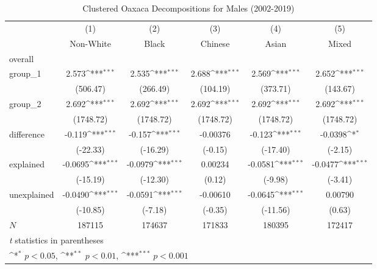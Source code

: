 \begin{table}[htbp]\centering
\def\sym#1{\ifmmode^{#1}\else\(^{#1}\)\fi}
\caption{Clustered Oaxaca Decompositions for Males (2002-2019)\label{tab1}}
\begin{tabular}{l*{5}{c}}
\hline\hline
            &\multicolumn{1}{c}{(1)}&\multicolumn{1}{c}{(2)}&\multicolumn{1}{c}{(3)}&\multicolumn{1}{c}{(4)}&\multicolumn{1}{c}{(5)}\\
            &\multicolumn{1}{c}{Non-White}&\multicolumn{1}{c}{Black}&\multicolumn{1}{c}{Chinese}&\multicolumn{1}{c}{Asian}&\multicolumn{1}{c}{Mixed}\\
\hline
overall     &                     &                     &                     &                     &                     \\
group\_1     &       2.573\sym{***}&       2.535\sym{***}&       2.688\sym{***}&       2.569\sym{***}&       2.652\sym{***}\\
            &    (506.47)         &    (266.49)         &    (104.19)         &    (373.71)         &    (143.67)         \\
group\_2     &       2.692\sym{***}&       2.692\sym{***}&       2.692\sym{***}&       2.692\sym{***}&       2.692\sym{***}\\
            &   (1748.72)         &   (1748.72)         &   (1748.72)         &   (1748.72)         &   (1748.72)         \\
difference  &      -0.119\sym{***}&      -0.157\sym{***}&    -0.00376         &      -0.123\sym{***}&     -0.0398\sym{*}  \\
            &    (-22.33)         &    (-16.29)         &     (-0.15)         &    (-17.40)         &     (-2.15)         \\
explained   &     -0.0695\sym{***}&     -0.0979\sym{***}&     0.00234         &     -0.0581\sym{***}&     -0.0477\sym{***}\\
            &    (-15.19)         &    (-12.30)         &      (0.12)         &     (-9.98)         &     (-3.41)         \\
unexplained &     -0.0490\sym{***}&     -0.0591\sym{***}&    -0.00610         &     -0.0645\sym{***}&     0.00790         \\
            &    (-10.85)         &     (-7.18)         &     (-0.35)         &    (-11.56)         &      (0.63)         \\
\hline
\(N\)       &      187115         &      174637         &      171833         &      180395         &      172417         \\
\hline\hline
\multicolumn{6}{l}{\footnotesize \textit{t} statistics in parentheses}\\
\multicolumn{6}{l}{\footnotesize \sym{*} \(p<0.05\), \sym{**} \(p<0.01\), \sym{***} \(p<0.001\)}\\
\end{tabular}
\label{tab:oaxaca_male_clustered}
\end{table}
